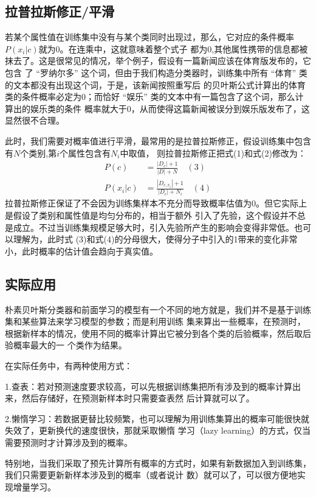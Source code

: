 \documentclass[UTF8]{ctexart}
\begin{document}
{\subsection{拉普拉斯修正/平滑}
若某个属性值在训练集中没有与某个类同时出现过，那么，它对应的条件概率$P(x_i|c)$就为0。在连乘中，这就意味着整个式子
都为0,其他属性携带的信息都被抹去了。这是很常见的情况，举个例子，假设有一篇新闻应该在体育版发布的，它包含
了 “罗纳尔多” 这个词，但由于我们构造分类器时，训练集中所有 “体育” 类的文本都没有出现这个词，于是，该新闻按照重写后
的贝叶斯公式计算出的体育类的条件概率必定为0；而恰好 “娱乐” 类的文本中有一篇包含了这个词，那么计算出的娱乐类的条件
概率就大于0，从而使得这篇新闻被误分到娱乐版发布了，这显然很不合理。\par
此时，我们需要对概率值进行平滑，最常用的是拉普拉斯修正，假设训练集中包含有$N$个类别,第$i$个属性包含有$N_i$中取值，
则拉普拉斯修正把式(1)和式(2)修改为：
\begin{align*}
        P(c)&=\frac{|D_c|+1}{|D|+N}\quad(3)\\[2ex]
        P(x_i|c)&=\frac{|D_{c,x_i}|+1}{|D_c|+N_i}\quad(4)
\end{align*}
拉普拉斯修正保证了不会因为训练集样本不充分而导致概率估值为0。但它实际上是假设了类别和属性值是均匀分布的，相当于额外
引入了先验，这个假设并不总是成立。不过当训练集规模足够大时，引入先验所产生的影响会变得非常低。也可以理解为，此时式
(3)和式(4)的分母很大，使得分子中引入的1带来的变化非常小，此时概率的估计值会趋向于真实值。\newpage
\subsection{实际应用}
朴素贝叶斯分类器和前面学习的模型有一个不同的地方就是，我们并不是基于训练集和某些算法来学习模型的参数；而是利用训练
集来算出一些概率，在预测时，根据新样本的情况，使用不同的概率计算出它被分到各个类的后验概率，然后取后验概率最大的一
个类作为结果。\par
在实际任务中，有两种使用方式：\par
1.查表：若对预测速度要求较高，可以先根据训练集把所有涉及到的概率计算出来，然后存储好，在预测新样本时只需要查表然
后计算就可以了。\par
2.懒惰学习：若数据更替比较频繁，也可以理解为用训练集算出的概率可能很快就失效了，更新换代的速度很快，那就采取懒惰
学习（lazy learning）的方式，仅当需要预测时才计算涉及到的概率。\par
特别地，当我们采取了预先计算所有概率的方式时，如果有新数据加入到训练集，我们只需要更新新样本涉及到的概率（或者说计
数）就可以了，可以很方便地实现增量学习。\newpage
}
\end{document}
